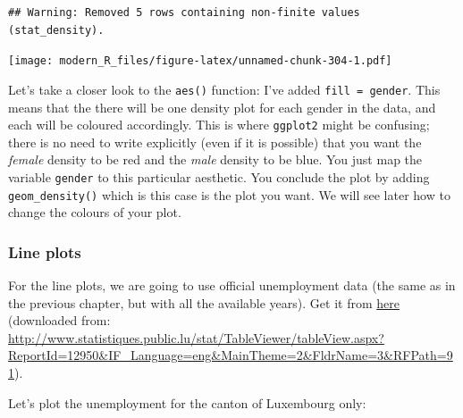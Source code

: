 \documentclass[]{gitbook}
\newenvironment{Shaded}{\begin{snugshade}}{\end{snugshade}}
\newcommand{\DataTypeTok}[1]{\textcolor[rgb]{0.13,0.29,0.53}{#1}}
\newcommand{\DecValTok}[1]{\textcolor[rgb]{0.00,0.00,0.81}{#1}}
\newcommand{\KeywordTok}[1]{\textcolor[rgb]{0.13,0.29,0.53}{\textbf{#1}}}
\newcommand{\NormalTok}[1]{#1}
\newcommand{\OperatorTok}[1]{\textcolor[rgb]{0.81,0.36,0.00}{\textbf{#1}}}
\newcommand{\StringTok}[1]{\textcolor[rgb]{0.31,0.60,0.02}{#1}}
\theoremstyle{definition}
\theoremstyle{definition}
\theoremstyle{definition}
\theoremstyle{remark}
\begin{document}
\begin{verbatim}
## Warning: Removed 5 rows containing non-finite values (stat_density).
\end{verbatim}

\texttt{[image: modern\_R\_files/figure-latex/unnamed-chunk-304-1.pdf]}

Let's take a closer look to the \texttt{aes()} function: I've added
\texttt{fill\ =\ gender}. This means that the there will be one density
plot for each gender in the data, and each will be coloured accordingly.
This is where \texttt{ggplot2} might be confusing; there is no need to
write explicitly (even if it is possible) that you want the
\emph{female} density to be red and the \emph{male} density to be blue.
You just map the variable \texttt{gender} to this particular aesthetic.
You conclude the plot by adding \texttt{geom\_density()} which is this
case is the plot you want. We will see later how to change the colours
of your plot.

\hypertarget{line-plots}{%
\subsubsection{Line plots}\label{line-plots}}

For the line plots, we are going to use official unemployment data (the
same as in the previous chapter, but with all the available years). Get
it from
\href{https://github.com/b-rodrigues/modern_R/tree/master/datasets/unemployment/all}{here}
(downloaded from:
\url{http://www.statistiques.public.lu/stat/TableViewer/tableView.aspx?ReportId=12950\&IF_Language=eng\&MainTheme=2\&FldrName=3\&RFPath=91}).

Let's plot the unemployment for the canton of Luxembourg only:

\begin{Shaded}
\end{Shaded}
\end{document}
